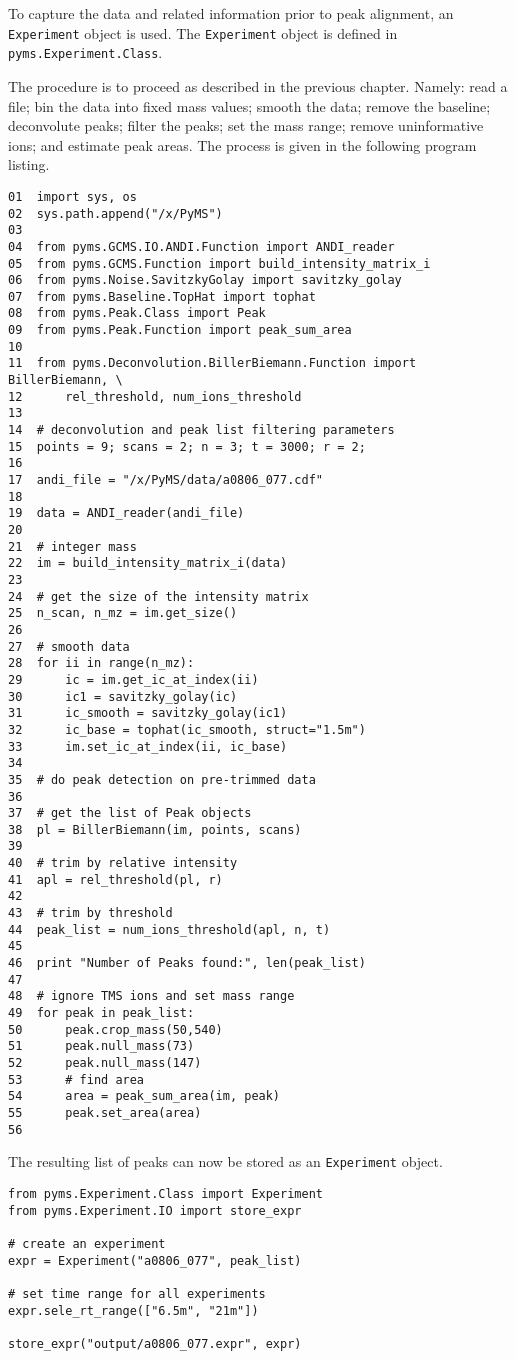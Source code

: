 To capture the data and related information prior to peak alignment, an
{\tt Experiment} object is used. The {\tt Experiment} object is defined in
{\tt pyms.Experiment.Class}.

The procedure is to proceed as described in the previous chapter. Namely: read
a file; bin the data into fixed mass values; smooth the data; remove the
baseline; deconvolute peaks; filter the peaks; set the mass range; remove
uninformative ions; and estimate peak areas.  The process is given in the
following program listing.

\begin{verbatim}
01  import sys, os
02  sys.path.append("/x/PyMS")
03
04  from pyms.GCMS.IO.ANDI.Function import ANDI_reader
05  from pyms.GCMS.Function import build_intensity_matrix_i
06  from pyms.Noise.SavitzkyGolay import savitzky_golay
07  from pyms.Baseline.TopHat import tophat
08  from pyms.Peak.Class import Peak
09  from pyms.Peak.Function import peak_sum_area
10
11  from pyms.Deconvolution.BillerBiemann.Function import BillerBiemann, \
12      rel_threshold, num_ions_threshold
13
14  # deconvolution and peak list filtering parameters
15  points = 9; scans = 2; n = 3; t = 3000; r = 2;
16
17  andi_file = "/x/PyMS/data/a0806_077.cdf"
18
19  data = ANDI_reader(andi_file)
20
21  # integer mass
22  im = build_intensity_matrix_i(data)
23
24  # get the size of the intensity matrix
25  n_scan, n_mz = im.get_size()
26
27  # smooth data
28  for ii in range(n_mz):
29      ic = im.get_ic_at_index(ii)
30      ic1 = savitzky_golay(ic)
31      ic_smooth = savitzky_golay(ic1)
32      ic_base = tophat(ic_smooth, struct="1.5m")
33      im.set_ic_at_index(ii, ic_base)
34
35  # do peak detection on pre-trimmed data
36
37  # get the list of Peak objects
38  pl = BillerBiemann(im, points, scans)
39
40  # trim by relative intensity
41  apl = rel_threshold(pl, r)
42
43  # trim by threshold
44  peak_list = num_ions_threshold(apl, n, t)
45
46  print "Number of Peaks found:", len(peak_list)
47
48  # ignore TMS ions and set mass range
49  for peak in peak_list:
50      peak.crop_mass(50,540)
51      peak.null_mass(73)
52      peak.null_mass(147)
53      # find area
54      area = peak_sum_area(im, peak)
55      peak.set_area(area)
56
\end{verbatim}

The resulting list of peaks can now be stored as an {\tt Experiment} object.

\begin{verbatim}
from pyms.Experiment.Class import Experiment
from pyms.Experiment.IO import store_expr

# create an experiment
expr = Experiment("a0806_077", peak_list)

# set time range for all experiments
expr.sele_rt_range(["6.5m", "21m"])

store_expr("output/a0806_077.expr", expr)
\end{verbatim}

